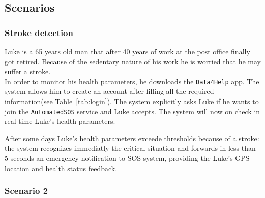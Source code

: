   \subsection{Scenarios}

    \subsubsection{Stroke detection} %
    \label{sec:}

      Luke is a 65 years old man that after 40 years of work at the post office finally got retired. Because of the sedentary nature of his work he is worried that he may suffer a stroke.\\
      In order to monitor his health parameters, %
      he downloads the \texttt{Data4Help} app. The system allows him to create an account after filling all the required information(see Table~\ref{tab:login}). The system explicitly asks Luke if he wants to join the \texttt{AutomatedSOS} service and Luke accepts. The system will now on check in real time Luke's health parameters. %

      After some days Luke's health parameters exceede thresholds because of a stroke: the system recognizes immediatly the critical situation and forwards in less than 5 seconds an emergency notification to SOS system, providing the Luke's GPS location and health status feedback.

    \subsubsection{Scenario 2}

